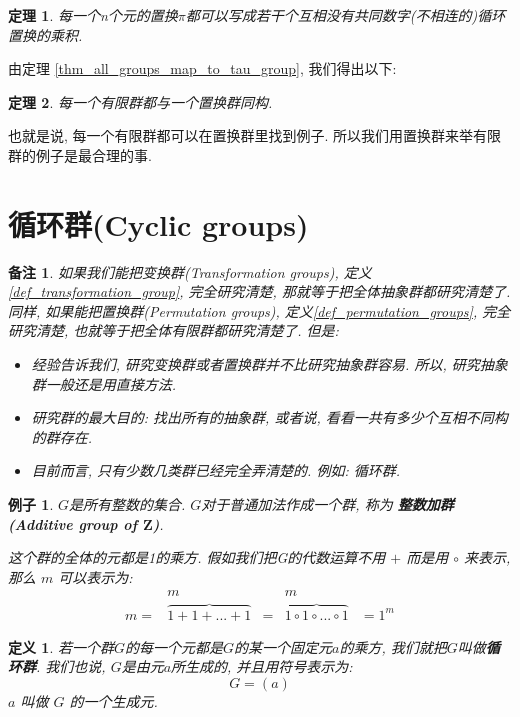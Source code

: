 \documentclass[utf8]{ctexbook}
\newtheorem{theorem}{定理}[section]
\newtheorem{definition}{定义}[section]
\newtheorem{memo}{备注}[section]
\newtheorem{example}{例子}[section]
\begin{document}
\begin{theorem}
每一个n个元的置换$\pi$都可以写成若干个互相没有共同数字(不相连的)循环置换的乘积.
\end{theorem}

由定理 \ref{thm_all_groups_map_to_tau_group}, 我们得出以下:

\begin{theorem}
每一个有限群都与一个置换群同构.
\end{theorem}

也就是说, 每一个有限群都可以在置换群里找到例子. 所以我们用置换群来举有限群的例子是最合理的事.

\section{循环群(Cyclic groups)}

\begin{memo}
如果我们能把变换群(Transformation groups), 定义\ref{def_transformation_group}, 完全研究清楚, 那就等于把全体抽象群都研究清楚了. 同样, 如果能把置换群(Permutation groups), 定义\ref{def_permutation_groups}, 完全研究清楚, 也就等于把全体有限群都研究清楚了. 但是:

\begin{itemize}
\item{经验告诉我们, 研究变换群或者置换群并不比研究抽象群容易. 所以, 研究抽象群一般还是用直接方法.}
\item{研究群的最大目的: 找出所有的抽象群, 或者说, 看看一共有多少个互相不同构的群存在.}
\item{目前而言, 只有少数几类群已经完全弄清楚的. 例如: 循环群.}
\end{itemize}
\end{memo}

\begin{example}
$G$是所有整数的集合. $G$对于普通加法作成一个群, 称为 \textbf{整数加群(Additive group of $\mathbf{Z}$)}.

这个群的全体的元都是1的乘方. 假如我们把G的代数运算不用 $+$ 而是用 $\circ$ 来表示, 那么 $m$ 可以表示为:
\begin{equation}\nonumber
\begin{array}{ccccc}
 & m & & m &  \\ 
m = & \overbrace{1 + 1 + ... + 1}  & = & \overbrace{1 \circ 1 \circ ... \circ 1 } & = 1^m
\end{array}
\end{equation}
\end{example}

\begin{definition}
若一个群$G$的每一个元都是$G$的某一个固定元$a$的乘方, 我们就把$G$叫做\textbf{循环群}. 我们也说, $G$是由元$a$所生成的, 并且用符号表示为:
\begin{equation}\nonumber
G=(a)
\end{equation}
$a$ 叫做 $G$ 的一个生成元.
\end{definition}
\end{document}
